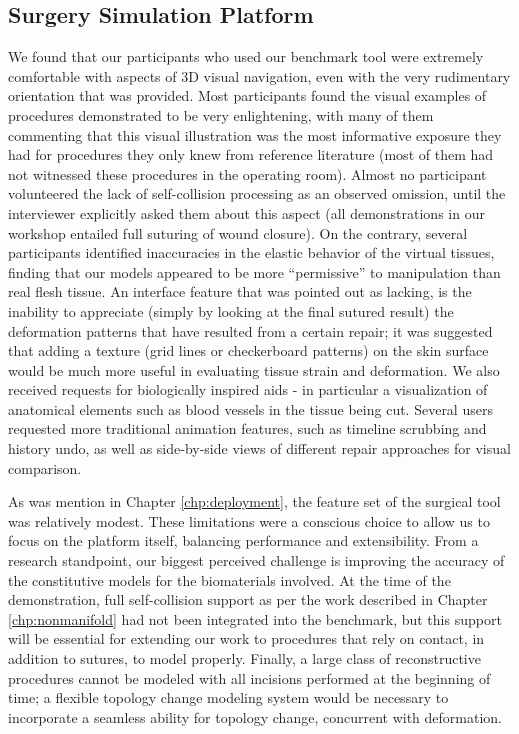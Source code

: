 \subsection{Surgery Simulation Platform}

We found that our participants who used our benchmark tool were
extremely comfortable with aspects of 3D visual navigation, even with
the very rudimentary orientation that was provided. Most participants
found the visual examples of procedures demonstrated to be very
enlightening, with many of them commenting that this visual
illustration was the most informative exposure they had for procedures
they only knew from reference literature (most of them had not
witnessed these procedures in the operating room). Almost no
participant volunteered the lack of self-collision processing as an
observed omission, until the interviewer explicitly asked them about
this aspect (all demonstrations in our workshop entailed full suturing
of wound closure). On the contrary, several participants identified
inaccuracies in the elastic behavior of the virtual tissues, finding
that our models appeared to be more ``permissive'' to manipulation
than real flesh tissue. An interface feature that was pointed out as
lacking, is the inability to appreciate (simply by looking at the
final sutured result) the deformation patterns that have resulted from
a certain repair; it was suggested that adding a texture (grid lines
or checkerboard patterns) on the skin surface would be much more
useful in evaluating tissue strain and deformation. We also received
requests for biologically inspired aids - in particular a
visualization of anatomical elements such as blood vessels in the
tissue being cut. Several users requested more traditional animation
features, such as timeline scrubbing and history undo, as well as
side-by-side views of different repair approaches for visual
comparison.

As was mention in Chapter \ref{chp:deployment}, the feature set of the
surgical tool was relatively modest. These limitations were a
conscious choice to allow us to focus on the platform itself,
balancing performance and extensibility. From a research standpoint,
our biggest perceived challenge is improving the accuracy of the
constitutive models for the biomaterials involved. At the time of the
demonstration, full self-collision support as per the work described
in Chapter \ref{chp:nonmanifold} had not been integrated into the
benchmark, but this support will be essential for extending our work
to procedures that rely on contact, in addition to sutures, to model
properly. Finally, a large class of reconstructive procedures cannot
be modeled with all incisions performed at the beginning of time; a
flexible topology change modeling system would be necessary to
incorporate a seamless ability for topology change, concurrent with
deformation.

